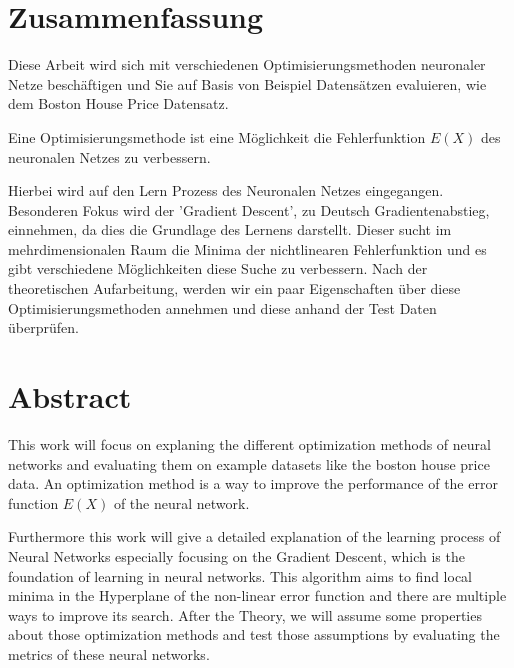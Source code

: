 \section*{Zusammenfassung}

Diese Arbeit wird sich mit verschiedenen Optimisierungsmethoden neuronaler Netze beschäftigen und Sie auf Basis von Beispiel Datensätzen evaluieren, wie dem Boston House Price Datensatz.

Eine Optimisierungsmethode ist eine Möglichkeit die Fehlerfunktion $E(X)$ des neuronalen Netzes zu verbessern. 
 
Hierbei wird auf den Lern Prozess des Neuronalen Netzes eingegangen. Besonderen Fokus wird der 'Gradient Descent', zu Deutsch Gradientenabstieg, einnehmen, da dies die Grundlage des Lernens darstellt. Dieser sucht im mehrdimensionalen Raum die Minima der nichtlinearen Fehlerfunktion und es gibt verschiedene Möglichkeiten diese Suche zu verbessern.   
Nach der theoretischen Aufarbeitung, werden wir ein paar Eigenschaften über diese Optimisierungsmethoden annehmen und diese anhand der Test Daten überprüfen.

\section*{Abstract}

This work will focus on explaning the different optimization methods of neural networks and evaluating them
on example datasets like the boston house price data.
An optimization method is a way to improve the performance of the error 
function $E(X)$ of the neural network. 

Furthermore this work will give a detailed explanation of the learning process of Neural Networks
especially focusing on the Gradient Descent, which is the foundation of learning in neural networks. This algorithm aims to find local minima in the Hyperplane of the non-linear error function and there are multiple ways to improve its search. 
After the Theory, we will assume some properties about those optimization methods and test those assumptions
by evaluating the metrics of these neural networks.

